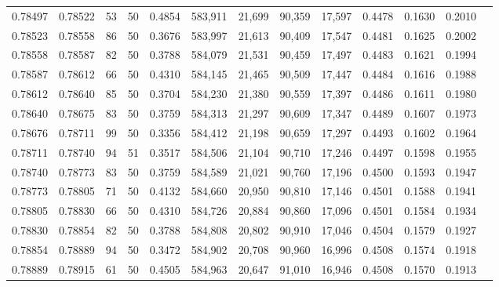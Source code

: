 \begin{tabular}{rrrrrrrrrrrrr}
0.78497 & 0.78522 &    53 &  50 &                                     0.4854 & 583,911 &  21,699 &  90,359 &  17,597 & 0.4478 & 0.1630 & 0.2010 \\
0.78523 & 0.78558 &    86 &  50 &                                     0.3676 & 583,997 &  21,613 &  90,409 &  17,547 & 0.4481 & 0.1625 & 0.2002 \\
0.78558 & 0.78587 &    82 &  50 &                                     0.3788 & 584,079 &  21,531 &  90,459 &  17,497 & 0.4483 & 0.1621 & 0.1994 \\
0.78587 & 0.78612 &    66 &  50 &                                     0.4310 & 584,145 &  21,465 &  90,509 &  17,447 & 0.4484 & 0.1616 & 0.1988 \\
0.78612 & 0.78640 &    85 &  50 &                                     0.3704 & 584,230 &  21,380 &  90,559 &  17,397 & 0.4486 & 0.1611 & 0.1980 \\
0.78640 & 0.78675 &    83 &  50 &                                     0.3759 & 584,313 &  21,297 &  90,609 &  17,347 & 0.4489 & 0.1607 & 0.1973 \\
0.78676 & 0.78711 &    99 &  50 &                                     0.3356 & 584,412 &  21,198 &  90,659 &  17,297 & 0.4493 & 0.1602 & 0.1964 \\
0.78711 & 0.78740 &    94 &  51 &                                     0.3517 & 584,506 &  21,104 &  90,710 &  17,246 & 0.4497 & 0.1598 & 0.1955 \\
0.78740 & 0.78773 &    83 &  50 &                                     0.3759 & 584,589 &  21,021 &  90,760 &  17,196 & 0.4500 & 0.1593 & 0.1947 \\
0.78773 & 0.78805 &    71 &  50 &                                     0.4132 & 584,660 &  20,950 &  90,810 &  17,146 & 0.4501 & 0.1588 & 0.1941 \\
0.78805 & 0.78830 &    66 &  50 &                                     0.4310 & 584,726 &  20,884 &  90,860 &  17,096 & 0.4501 & 0.1584 & 0.1934 \\
0.78830 & 0.78854 &    82 &  50 &                                     0.3788 & 584,808 &  20,802 &  90,910 &  17,046 & 0.4504 & 0.1579 & 0.1927 \\
0.78854 & 0.78889 &    94 &  50 &                                     0.3472 & 584,902 &  20,708 &  90,960 &  16,996 & 0.4508 & 0.1574 & 0.1918 \\
0.78889 & 0.78915 &    61 &  50 &                                     0.4505 & 584,963 &  20,647 &  91,010 &  16,946 & 0.4508 & 0.1570 & 0.1913 \\

\end{tabular}
